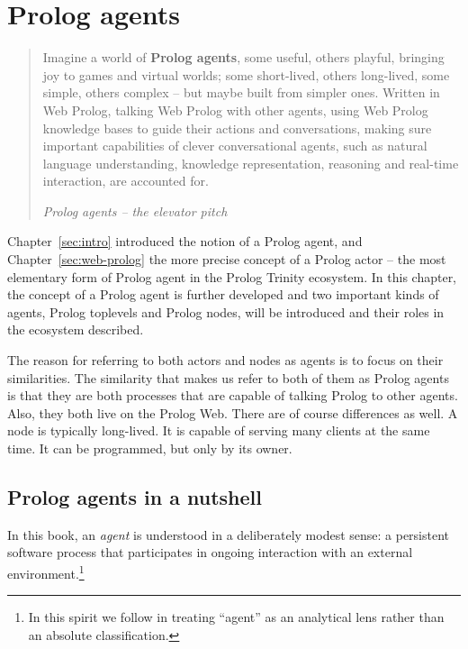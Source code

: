 \chapter{Prolog agents}\label{sec:prolog-agents}

\begin{quotation}
\noindent Imagine a world of \textbf{Prolog agents}, some useful, others playful, bringing joy to games and virtual worlds; some short-lived, others long-lived, some simple, others complex -- but maybe built from simpler ones. Written in Web Prolog, talking Web Prolog with other agents, using Web Prolog knowledge bases to guide their actions and conversations, making sure important capabilities of clever conversational agents, such as natural language understanding, knowledge representation, reasoning and real-time interaction, are accounted for.

\flushright\textit{Prolog agents -- the elevator pitch}
\end{quotation}

\vspace{1cm}

\noindent Chapter~\ref{sec:intro} introduced the notion of a Prolog agent, and Chapter~\ref{sec:web-prolog} the more precise concept of a Prolog actor -- the most elementary form of Prolog agent in the Prolog Trinity ecosystem. In this chapter, the concept of a Prolog agent is further developed and two important kinds of agents, Prolog toplevels and Prolog nodes, will be introduced and their roles in the ecosystem described.

The reason for referring to both actors and nodes as agents is to focus on their similarities. The similarity that makes us refer to both of them as Prolog agents is that they are both processes that are capable of talking Prolog to other agents. Also, they both live on the Prolog Web. There are of course differences as well. A node is typically long-lived. It is capable of serving many clients at the same time. It can be programmed, but only by its owner.

\section{Prolog agents in a nutshell}\label{sec:prolog-agents-nutshell}

In this book, an \emph{agent} is understood in a deliberately modest sense: a persistent software process that participates in ongoing interaction with an external environment.\footnote{In this spirit we follow \citet{russell2016artificial} in treating ``agent'' as an analytical lens rather than an absolute classification.}

